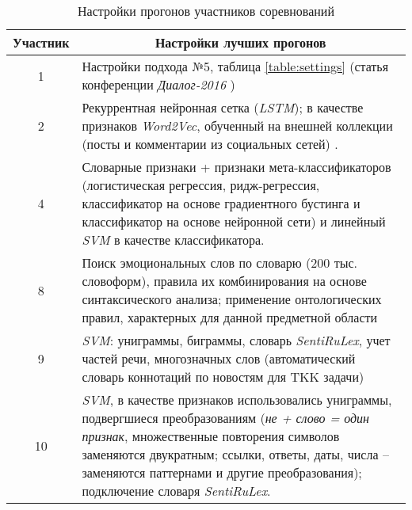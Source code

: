 \begin{table}[htp!]
\centering
\caption{Настройки прогонов участников соревнований}
\label{table:participants}
\begin{tabular}{cp{13.2cm}}
\hline
Участник        & \multicolumn{1}{|c}{Настройки лучших прогонов}                                                                                                                                                                                                                     \\ \hline
1               & Настройки подхода №5, таблица \ref{table:settings} (статья конференции {\it Диалог-2016} \cite{myArticle})                                                                                                                                                                                                        \\
2               & Рекуррентная нейронная сетка ({\it LSTM}); в качестве признаков {\it Word2Vec}, обученный на внешней коллекции (посты и комментарии из социальных сетей) \cite{neuralNetworks}.                                                                                                                                            \\
4               & Словарные признаки + признаки мета-классификаторов (логистическая регрессия, ридж-регрессия, классификатор на основе градиентного бустинга и классификатор на основе нейронной сети) и линейный {\it SVM} в качестве классификатора.                                                                 \\
8               & Поиск эмоциональных слов по словарю (200 тыс. словоформ), правила их комбинирования на основе синтаксического анализа; применение онтологических правил, характерных для данной предметной области                                                                                                  \\
9               & {\it SVM}: униграммы, биграммы, словарь {\it SentiRuLex}, учет частей речи, многозначных слов (автоматический словарь коннотаций по новостям для TKK задачи)                                                                                                                                         \\
10              & {\it SVM}, в качестве признаков использовались униграммы, подвергшиеся преобразованиям ({\it не + слово = один признак}, множественные повторения символов заменяются двукратным; ссылки, ответы, даты, числа – заменяются паттернами и другие преобразования); подключение словаря {\it SentiRuLex}.\\ \hline
\end{tabular}
\end{table}

